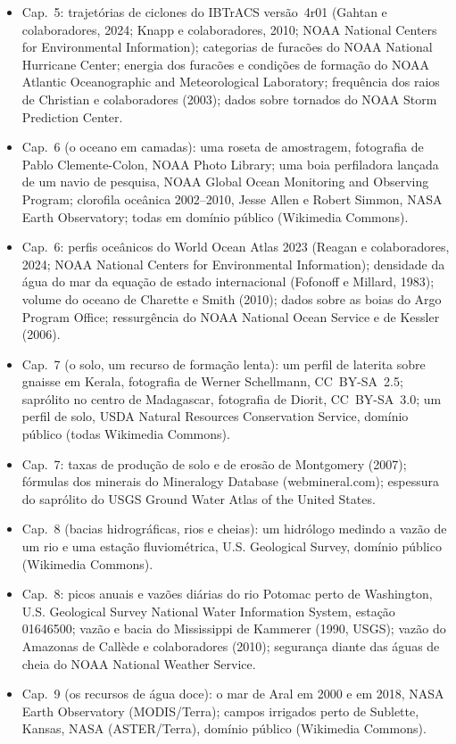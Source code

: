 \begin{itemize}
  \item Cap.~5: trajetórias de ciclones do IBTrACS versão~4r01 (Gahtan e colaboradores, 2024; Knapp e colaboradores, 2010; NOAA National Centers for Environmental Information); categorias de furacões do NOAA National Hurricane Center; energia dos furacões e condições de formação do NOAA Atlantic Oceanographic and Meteorological Laboratory; frequência dos raios de Christian e colaboradores (2003); dados sobre tornados do NOAA Storm Prediction Center.
  \item Cap.~6 (o oceano em camadas): uma roseta de amostragem, fotografia de Pablo Clemente-Colon, NOAA Photo Library; uma boia perfiladora lançada de um navio de pesquisa, NOAA Global Ocean Monitoring and Observing Program; clorofila oceânica 2002--2010, Jesse Allen e Robert Simmon, NASA Earth Observatory; todas em domínio público (Wikimedia Commons).
  \item Cap.~6: perfis oceânicos do World Ocean Atlas 2023 (Reagan e colaboradores, 2024; NOAA National Centers for Environmental Information); densidade da água do mar da equação de estado internacional (Fofonoff e Millard, 1983); volume do oceano de Charette e Smith (2010); dados sobre as boias do Argo Program Office; ressurgência do NOAA National Ocean Service e de Kessler (2006).
  \item Cap.~7 (o solo, um recurso de formação lenta): um perfil de laterita sobre gnaisse em Kerala, fotografia de Werner Schellmann, CC~BY-SA~2.5; saprólito no centro de Madagascar, fotografia de Diorit, CC~BY-SA~3.0; um perfil de solo, USDA Natural Resources Conservation Service, domínio público (todas Wikimedia Commons).
  \item Cap.~7: taxas de produção de solo e de erosão de Montgomery (2007); fórmulas dos minerais do Mineralogy Database (webmineral.com); espessura do saprólito do USGS Ground Water Atlas of the United States.
  \item Cap.~8 (bacias hidrográficas, rios e cheias): um hidrólogo medindo a vazão de um rio e uma estação fluviométrica, U.S. Geological Survey, domínio público (Wikimedia Commons).
  \item Cap.~8: picos anuais e vazões diárias do rio Potomac perto de Washington, U.S. Geological Survey National Water Information System, estação 01646500; vazão e bacia do Mississippi de Kammerer (1990, USGS); vazão do Amazonas de Callède e colaboradores (2010); segurança diante das águas de cheia do NOAA National Weather Service.
  \item Cap.~9 (os recursos de água doce): o mar de Aral em 2000 e em 2018, NASA Earth Observatory (MODIS/Terra); campos irrigados perto de Sublette, Kansas, NASA (ASTER/Terra), domínio público (Wikimedia Commons).

\end{itemize}
